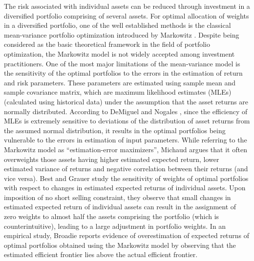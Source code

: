 \documentclass[12pt]{article}
\numberwithin{equation}{section}
\begin{document}
The risk associated with individual assets can be reduced through investment in a diversified portfolio comprising of several assets. For optimal allocation of weights in a diversified portfolio, one of the well established methods is the classical mean-variance portfolio optimization introduced by Markowitz \cite{Markowitz52,Markowitz59}. Despite being considered as the basic theoretical framework in the field of portfolio optimization, the Markowitz model is not widely accepted among investment practitioners. One of the most major limitations of the mean-variance model is the sensitivity of the optimal portfolios to the errors in the estimation of return and risk parameters. These parameters are estimated using sample mean and sample covariance matrix, which are maximum likelihood estimates (MLEs) (calculated using historical data) under the assumption that the asset returns are normally distributed. According to DeMiguel and Nogales \cite{DeMiguel09}, since the efficiency of MLEs is extremely sensitive to deviations of the distribution of asset returns from the assumed normal distribution, it results in the optimal portfolios being vulnerable to the errors in estimation of input parameters. While referring to the Markowitz model as ``estimation-error maximizers'', Michaud \cite{Michaud89} argues that it often overweights those assets having higher estimated expected return, lower estimated variance of returns and negative correlation between their returns (and vice versa). Best and Grauer \cite{Best91} study the sensitivity of weights of optimal portfolios with respect to changes in estimated expected returns of individual assets. Upon imposition of no short selling constraint, they observe that small changes in estimated expected return of individual assets can result in the assignment of zero weights to almost half the assets comprising the portfolio (which is counterintuitive), leading to a large adjustment in portfolio weights. In an empirical study, Broadie \cite{Broadie93} reports evidence of overestimation of expected returns of optimal portfolios obtained using the Markowitz model by observing that the estimated efficient frontier lies above the actual efficient frontier.
\end{document}
